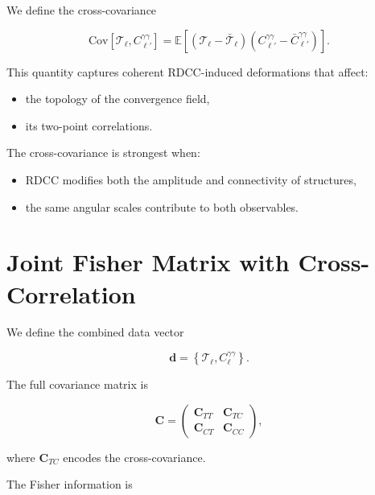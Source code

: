 \documentclass[11pt,a4paper]{article}
\begin{document}
We define the cross-covariance

\begin{equation}
    \mathrm{Cov}\!\left[
        \mathcal{T}_{\ell},
        C_{\ell'}^{\gamma\gamma}
    \right]
    =
    \mathbb{E}\!\left[
        \left(\mathcal{T}_{\ell} - \bar{\mathcal{T}}_{\ell}\right)
        \left(C_{\ell'}^{\gamma\gamma} - \bar{C}_{\ell'}^{\gamma\gamma}\right)
    \right].
\end{equation}

This quantity captures coherent RDCC-induced deformations that affect:

\begin{itemize}
    \item the topology of the convergence field,
    \item its two-point correlations.
\end{itemize}

The cross-covariance is strongest when:

\begin{itemize}
    \item RDCC modifies both the amplitude and connectivity of structures,
    \item the same angular scales contribute to both observables.
\end{itemize}
\section{Joint Fisher Matrix with Cross-Correlation}

We define the combined data vector



\[
    \mathbf{d}
    =
    \left\{
        \mathcal{T}_{\ell},
        C_{\ell}^{\gamma\gamma}
    \right\}.
\]



The full covariance matrix is



\[
    \mathbf{C}
    =
    \begin{pmatrix}
        \mathbf{C}_{TT} & \mathbf{C}_{TC} \\
        \mathbf{C}_{CT} & \mathbf{C}_{CC}
    \end{pmatrix},
\]



where $\mathbf{C}_{TC}$ encodes the cross-covariance.

The Fisher information is
\end{document}
